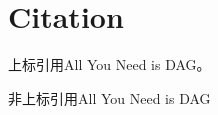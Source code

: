 \section{Citation}

上标引用All You Need is DAG\cite{keidar2021all}。

非上标引用All You Need is DAG\parencite{keidar2021all}